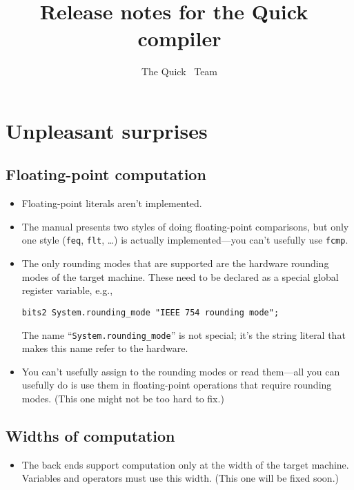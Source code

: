 \documentclass{article}
\title{Release notes for the Quick~{\PAL} compiler}
\author{The Quick~{\PAL} Team}
\begin{document}
\maketitle

\tableofcontents

\clearpage

\section{Unpleasant surprises}

\subsection{Floating-point computation}

\begin{itemize}
\item
Floating-point literals aren't implemented.
\item
The manual presents two styles of doing floating-point comparisons,
but only one style (\texttt{feq}, \texttt{flt}, \ldots) is actually
implemented---you can't usefully use \texttt{fcmp}.
\item
The only rounding modes that are supported are the hardware rounding
modes of the target machine.
These need to be declared as a special global register variable, e.g.,
\begin{verbatim}
bits2 System.rounding_mode "IEEE 754 rounding mode";
\end{verbatim}
The name ``\texttt{System.rounding\_mode}'' is not special; it's the
string literal that makes this name refer to the hardware.
\item
You can't usefully assign to the rounding modes or read them---all you
can usefully do is use them in floating-point operations that require
rounding modes.
(This one might not be too hard to fix.)
\end{itemize}

\subsection{Widths of computation}

\begin{itemize}
\item
The back ends support computation only at the width of the target
machine.
Variables and operators must use this width.
(This one will be fixed soon.)
\end{itemize}
\end{document}

